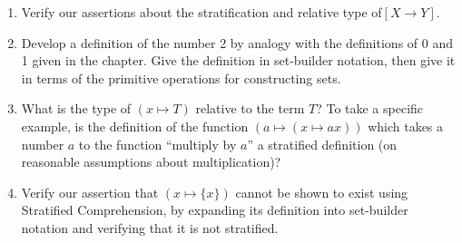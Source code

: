 \Exercises

\begin{enumerate}
\item  Verify our assertions about the stratification and
  relative type of\linebreak $[X \rightarrow Y]$.

\item  Develop a definition of the number 2 by analogy with the definitions of
  0 and 1 given in the chapter.  Give the definition in set-builder notation,
  then give it in terms of the primitive operations for constructing sets.

\item  What is the type of $(x \mapsto T)$ relative to the term $T$?  To take a
  specific example, is the definition of the function $(a
  \mapsto (x \mapsto ax))$ which takes a number $a$ to the function ``multiply
  by $a$'' a stratified definition (on reasonable
  assumptions about multiplication)?

\item  Verify our assertion that $(x \mapsto \{x\})$ cannot be shown to exist
  using Stratified Comprehension, by
  expanding its definition into set-builder notation and verifying that it is
  not stratified.
\end{enumerate}
